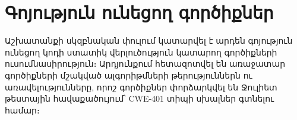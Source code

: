 {
    \section{Գոյություն ունեցող գործիքներ}\label{sec:existingTools}
    Աշխատանքի սկզբնական փուլում կատարվել է արդեն գոյություն ունեցող կոդի ստատիկ վերլուծություն կատարող գործիքների
    ուսումնասիրություն։ Արդյունքում հետազոտվել են առաջատար գործիքների մշակված ալգորիթմների թերություններն ու
    առավելությունները, որոշ գործիքներ փորձարկվել են Ջուլիետ թեստային հավաքածույում՝ CWE-401 տիպի սխալներ\cite{CWE401}
    գտնելու համար։

    

    

    

    

    

    

    

    
}